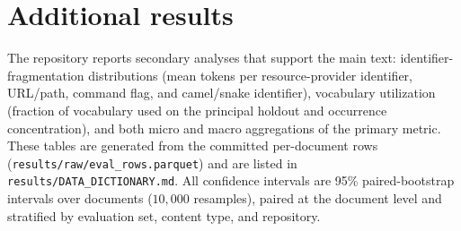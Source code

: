 \section{Additional results}
\label{app:additional}
The repository reports secondary analyses that support the main text:
identifier-fragmentation distributions (mean tokens per resource-provider
identifier, URL/path, command flag, and camel/snake identifier), vocabulary
utilization (fraction of vocabulary used on the principal holdout and occurrence
concentration), and both micro and macro aggregations of the primary metric. These
tables are generated from the committed per-document rows
(\texttt{results/raw/eval\_rows.parquet}) and are listed in
\texttt{results/DATA\_DICTIONARY.md}. All confidence intervals are 95\%
paired-bootstrap intervals over documents ($10{,}000$ resamples), paired at the
document level and stratified by evaluation set, content type, and repository.
